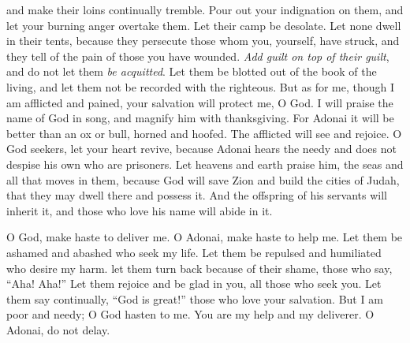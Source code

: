 \begin{biblechapter}
and make their loins continually tremble.
\verse Pour out your indignation on them, 
and let your burning anger overtake them.
\verse Let their camp be desolate. 
Let none dwell in their tents,
\verse because they persecute those whom you, yourself, have struck, 
and they tell of the pain of those you have wounded.
\verse \textit{Add guilt on top of their guilt}, 
and do not let them \textit{be acquitted}.
\verse Let them be blotted out of the book of the living, 
and let them not be recorded with the righteous.
\verse But as for me, though I am afflicted and pained, 
your salvation will protect me, O God.
\verse I will praise the name of God in song, 
and magnify him with thanksgiving.
\verse For Adonai it will be better than an ox or bull, 
horned and hoofed.
\verse The afflicted will see and rejoice. 
O God seekers, let your heart revive,
\verse because Adonai hears the needy 
and does not despise his own who are prisoners.
\verse Let heavens and earth praise him, 
the seas and all that moves in them,
\verse because God will save Zion 
and build the cities of Judah, 
that they may dwell there and possess it.
\verse And the offspring of his servants will inherit it, 
and those who love his name will abide in it.
\end{biblechapter}

\begin{biblechapter} %
 O God, make haste to deliver me. 
O Adonai, make haste to help me.
\verse Let them be ashamed and abashed 
who seek my life. 
Let them be repulsed and humiliated 
who desire my harm.
\verse let them turn back because of their shame, 
those who say, “Aha! Aha!”
\verse Let them rejoice and be glad in you, 
all those who seek you. 
Let them say continually, “God is great!” 
those who love your salvation.
\verse But I am poor and needy; 
O God hasten to me. 
You are my help and my deliverer. 
O Adonai, do not delay.
\end{biblechapter}

